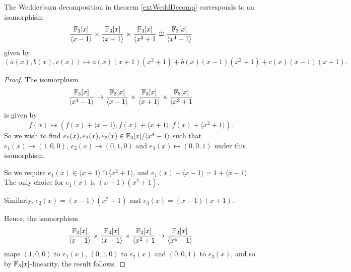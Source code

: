 \documentclass{unswmaths}
\begin{document}
\begin{lemma}
\label{intWeddDecomp}
    The Wedderburn decomposition in theorem \ref{extWeddDecomp} corresponds to
    an isomorphism
    \begin{equation*}
        \frac{{\mathbb{F}_3}[x]}{\langle x-1\rangle}\times\frac{{\mathbb{F}_3}[x]}{\langle x+1\rangle}\times\frac{{\mathbb{F}_3}[x]}{\langle x^2+1}\cong \frac{{\mathbb{F}_3}[x]}{\langle x^4-1\rangle}
    \end{equation*}
    given by
    \begin{equation*}
        (a(x),b(x),c(x))\mapsto a(x)(x+1)(x^2+1)+b(x)(x-1)(x^2+1)+c(x)(x-1)(x+1).
    \end{equation*}
\end{lemma}
\begin{proof}
    The isomorphism
    \begin{equation*}
        \frac{{\mathbb{F}_3}[x]}{\langle x^4-1\rangle} \rightarrow \frac{{\mathbb{F}_3}[x]}{\langle x-1\rangle}\times\frac{{\mathbb{F}_3}[x]}{\langle x+1\rangle}\times\frac{{\mathbb{F}_3}[x]}{\langle x^2+1}
    \end{equation*}
    is given by
    \begin{equation*}
        f(x) \mapsto (f(x)+\langle x-1\rangle,f(x)+\langle x+1\rangle,f(x)+\langle x^2+1\rangle).
    \end{equation*}
    So we wish to find $e_1(x),e_2(x),e_3(x) \in {\mathbb{F}_3}[x]/\langle x^4-1\rangle$ such that $e_1(x)\mapsto (1,0,0)$,
    $e_2(x)\mapsto (0,1,0)$ and $e_3(x)\mapsto (0,0,1)$ under this isomorphism.
    
    So we require $e_1(x) \in \langle x+1\rangle\cap\langle x^2+1\rangle$, and 
    $e_1(x) + \langle x-1\rangle = 1+\langle x-1\rangle$. The only choice for $e_1(x)$
    is $(x+1)(x^2+1)$. 
    
    Similarly, $e_2(x) = (x-1)(x^2+1)$ and $e_3(x) = (x-1)(x+1)$. 
    
    Hence, the isomorphism
    \begin{equation*}
        \frac{{\mathbb{F}_3}[x]}{\langle x-1\rangle}\times\frac{{\mathbb{F}_3}[x]}{\langle x+1\rangle}\times\frac{{\mathbb{F}_3}[x]}{\langle x^2+1}\rightarrow \frac{{\mathbb{F}_3}[x]}{\langle x^4-1\rangle}
    \end{equation*}
    maps $(1,0,0)$ to $e_1(x)$, $(0,1,0)$ to $e_2(x)$ and $(0,0,1)$ to $e_3(x)$, and 
    so by ${\mathbb{F}_3}[x]$-linearity, the result follows.
\end{proof}
\end{document}
